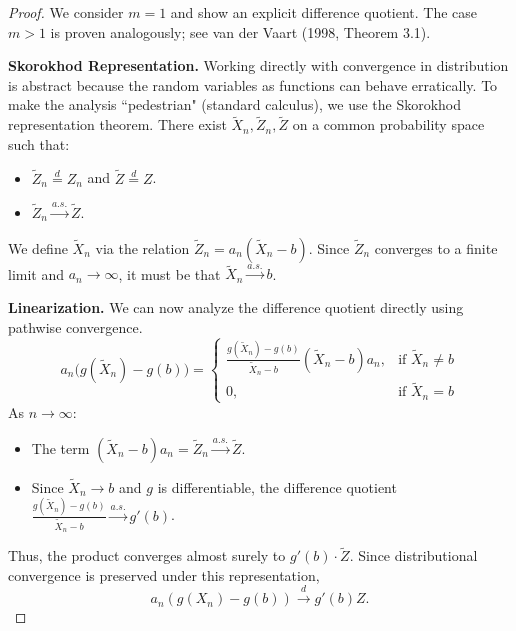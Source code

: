 \begin{proof}
We consider $m=1$ and show an explicit difference quotient. The case $m>1$ is proven analogously; see van der Vaart (1998, Theorem 3.1).

\textbf{Skorokhod Representation.}
Working directly with convergence in distribution is abstract because the random variables as functions can behave erratically. To make the analysis ``pedestrian" (standard calculus), we use the Skorokhod representation theorem.
There exist $\tilde{X}_n, \tilde{Z}_n, \tilde{Z}$ on a common probability space such that:
\begin{itemize}
    \item $\tilde{Z}_n \stackrel{d}{=} Z_n$ and $\tilde{Z} \stackrel{d}{=} Z$.
    \item $\tilde{Z}_n \xrightarrow{a.s.} \tilde{Z}$.
\end{itemize}
We define $\tilde{X}_n$ via the relation $\tilde{Z}_n = a_n(\tilde{X}_n - b)$. Since $\tilde{Z}_n$ converges to a finite limit and $a_n \to \infty$, it must be that $\tilde{X}_n \xrightarrow{a.s.} b$.

\textbf{Linearization.}
We can now analyze the difference quotient directly using pathwise convergence.
\[
a_n\big(g(\tilde{X}_n)-g(b)\big) =
\begin{cases}
\frac{g(\tilde{X}_n)-g(b)}{\tilde{X}_n-b}(\tilde{X}_n-b)a_n, & \text{if } \tilde{X}_n \neq b \\
0, & \text{if } \tilde{X}_n = b
\end{cases}
\]
As $n \to \infty$:
\begin{itemize}
    \item The term $(\tilde{X}_n - b)a_n = \tilde{Z}_n \xrightarrow{a.s.} \tilde{Z}$.
    \item Since $\tilde{X}_n \to b$ and $g$ is differentiable, the difference quotient $\frac{g(\tilde{X}_n)-g(b)}{\tilde{X}_n-b} \xrightarrow{a.s.} g'(b)$.
\end{itemize}
Thus, the product converges almost surely to $g'(b) \cdot \tilde{Z}$. Since distributional convergence is preserved under this representation,
\[ a_n(g(X_n) - g(b)) \xrightarrow{d} g'(b)Z. \]
\end{proof}

